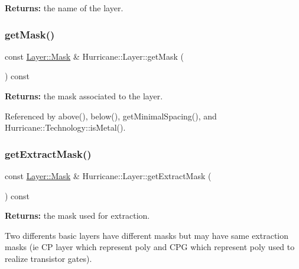 {\bfseries Returns\+:} the name of the layer. \mbox{\label{classHurricane_1_1Layer_a29b22c3b59cc24bf82449ad6c068ff1f}} 
\subsubsection{\texorpdfstring{get\+Mask()}{getMask()}}
{\footnotesize\ttfamily const \hyperlink{classHurricane_1_1Layer_af5277c670637bd5d910237e7afe01a91}{Layer\+::\+Mask} \& Hurricane\+::\+Layer\+::get\+Mask (\begin{DoxyParamCaption}{ }\end{DoxyParamCaption}) const\hspace{0.3cm}{\ttfamily [inline]}}

{\bfseries Returns\+:} the mask associated to the layer. 

Referenced by above(), below(), get\+Minimal\+Spacing(), and Hurricane\+::\+Technology\+::is\+Metal().

\mbox{\label{classHurricane_1_1Layer_af009bbd89a8e8260122b7244bfa10349}} 
\subsubsection{\texorpdfstring{get\+Extract\+Mask()}{getExtractMask()}}
{\footnotesize\ttfamily const \hyperlink{classHurricane_1_1Layer_af5277c670637bd5d910237e7afe01a91}{Layer\+::\+Mask} \& Hurricane\+::\+Layer\+::get\+Extract\+Mask (\begin{DoxyParamCaption}{ }\end{DoxyParamCaption}) const\hspace{0.3cm}{\ttfamily [inline]}}

{\bfseries Returns\+:} the mask used for extraction.

Two differents basic layers have different masks but may have same extraction masks (ie CP layer which represent poly and C\+PG which represent poly used to realize transistor gates). \mbox{\label{classHurricane_1_1Layer_afed9a488bf20daaeed18874f2b16268e}} 

